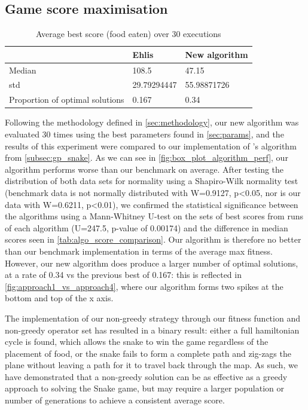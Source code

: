 \documentclass[british,10pt,a4paper]{article}
\begin{document}
\subsection{Game score maximisation}

\begin{table}[b]
	\centering
	\begin{tabular}{|l|l|l|}
	\hline
	 & Ehlis & New algorithm \\ \hline
	Median & 108.5 & 47.15 \\ \hline
	std & 29.79294447 & 55.98871726 \\ \hline
	Proportion of optimal solutions & 0.167 & 0.34 \\ \hline
	\end{tabular}
	\caption{Average best score (food eaten) over 30 executions}
	\label{tab:algo_score_comparison}
\end{table}
Following the methodology defined in \autoref{sec:methodology}, our new algorithm was evaluated 30 times using the best parameters found in \autoref{sec:params}, and the results of this experiment were compared to our implementation of \citet{Ehlis2000-sz}'s algorithm from \autoref{subsec:gp_snake}. As we can see in \autoref{fig:box_plot_algorithm_perf}, our algorithm performs worse than our benchmark on average. After testing the distribution of both data sets for normality using a Shapiro-Wilk normality test \cite{Shapiro1965-my} (benchmark data is not normally distributed with W=0.9127, p<0.05, nor is our data with W=0.6211, p<0.01), we confirmed the statistical significance between the algorithms using a Mann-Whitney U-test on the sets of best scores from runs of each algorithm (U=247.5, p-value of 0.00174) and the difference in median scores seen in \autoref{tab:algo_score_comparison}. Our algorithm is therefore no better than our benchmark implementation in terms of the average max fitness. However, our new algorithm does produce a larger number of optimal solutions, at a rate of 0.34 vs the previous best of 0.167: this is reflected in \autoref{fig:approach1_vs_approach4}, where our algorithm forms two spikes at the bottom and top of the x axis. \newline

The implementation of our non-greedy strategy through our fitness function and non-greedy operator set has resulted in a binary result: either a full hamiltonian cycle is found, which allows the snake to win the game regardless of the placement of food, or the snake fails to form a complete path and zig-zags the plane without leaving a path for it to travel back through the map. As such, we have demonstrated that a non-greedy solution can be as effective as a greedy approach to solving the Snake game, but may require a larger population or number of generations to achieve a consistent average score.
\end{document}
